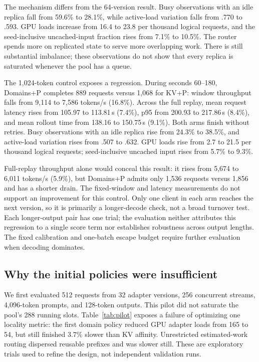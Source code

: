 The mechanism differs from the 64-version result. Busy observations with an
idle replica fall from 59.6\% to 28.1\%, while active-load variation falls from
.770 to .593. GPU loads increase from 16.4 to 23.8 per thousand logical
requests, and the seed-inclusive uncached-input fraction rises from 7.1\% to
10.5\%. The router spends more on replicated state to serve more overlapping
work. There is still substantial imbalance; these observations do not show
that every replica is saturated whenever the pool has a queue.

The 1,024-token control exposes a regression. During seconds 60--180,
Domains+P completes 889 requests versus 1,068 for KV+P: window throughput
falls from 9,114 to 7,586 tokens/s (16.8\%). Across the full replay, mean
request latency rises from 105.97 to 113.81\,s (7.4\%), p95 from 200.93 to
217.86\,s (8.4\%), and mean rollout time from 138.16 to 150.75\,s (9.1\%).
Both arms finish without retries. Busy observations with an idle replica rise
from 24.3\% to 38.5\%, and active-load variation rises from .507 to .632.
GPU loads rise from 2.7 to 21.5 per thousand logical requests; seed-inclusive
uncached input rises from 5.7\% to 9.3\%.

Full-replay throughput alone would conceal this result: it rises from 5,674
to 6,011 tokens/s (5.9\%), but Domains+P admits only 1,536 requests versus
1,856 and has a shorter drain. The fixed-window and latency measurements do
not support an improvement for this control. Only one client in each arm
reaches the next version, so it is primarily a longer-decode check, not a
broad turnover test. Each longer-output pair has one trial; the evaluation
neither attributes this regression to a single score term nor establishes
robustness across output lengths. The fixed calibration and one-batch escape
budget require further evaluation when decoding dominates.

\subsection{Why the initial policies were insufficient}
We first evaluated 512 requests from 32 adapter versions, 256 concurrent streams,
4,096-token prompts, and 128-token outputs. This pilot did not saturate the
pool's 288 running slots. Table~\ref{tab:pilot} exposes a failure of optimizing
one locality metric: the first domain policy reduced GPU adapter loads from
165 to 54, but still finished 3.7\% slower than KV affinity. Unrestricted
estimated-work routing dispersed reusable prefixes and was slower still.
These are exploratory trials used to refine the design, not independent
validation runs.

